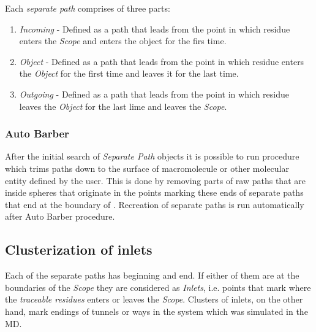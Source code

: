 \documentclass[a4paper,10pt,english]{sphinxmanual}
\begin{document}
Each \emph{separate path} comprises of three parts:
\begin{enumerate}
\item {} 
\emph{Incoming} - Defined as a path that leads from the point in which residue enters the \emph{Scope} and enters the object for the firs time.

\item {} 
\emph{Object} - Defined as a path that leads from the point in which residue enters the \emph{Object} for the first time and leaves it for the last time.

\item {} 
\emph{Outgoing} - Defined as a path that leads from the point in which residue leaves the \emph{Object} for the last lime and leaves the \emph{Scope}.

\end{enumerate}


\subsubsection{Auto Barber}
\label{valve/valve_manual:auto-barber-procedure}\label{valve/valve_manual:auto-barber}
After the initial search of \emph{Separate Path} objects it is possible to run procedure which trims paths down to the surface of macromolecule or other molecular entity defined by the user. This is done by removing parts of raw paths that are inside spheres that originate in the points marking these ends of separate paths that end at the boundary of . Recreation of separate paths is run automatically after Auto Barber procedure.


\subsection{Clusterization of inlets}
\label{valve/valve_manual:clusterization-of-inlets}\label{valve/valve_manual:id3}
Each of the separate paths has beginning and end. If either of them are at the boundaries of the \emph{Scope} they are considered as \emph{Inlets}, i.e. points that mark where the \emph{traceable residues} enters or leaves the \emph{Scope}. Clusters of inlets, on the other hand, mark endings of tunnels or ways in the system which was simulated in the MD.
\end{document}
